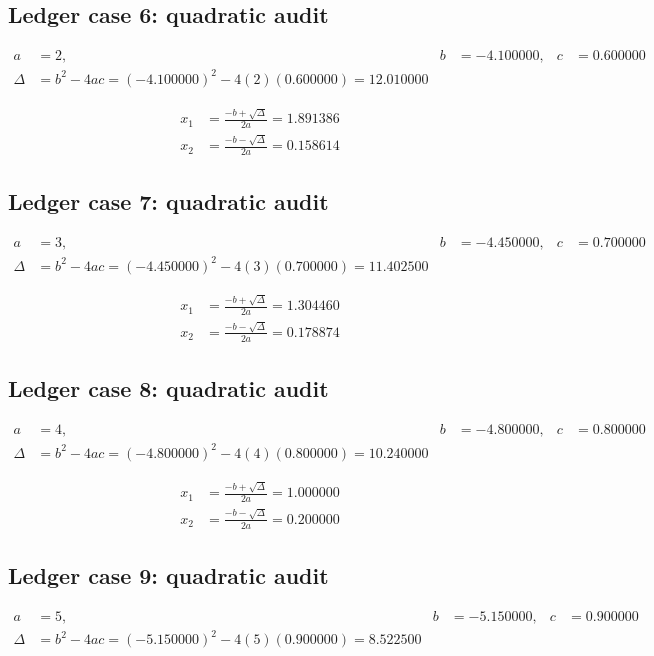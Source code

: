\documentclass[11pt,a4paper]{article}
\begin{document}
\subsection{Ledger case 6: quadratic audit}
\begin{align}
a &= 2, & b &= -4.100000, & c &= 0.600000 \\
\Delta &= b^2-4ac = (-4.100000)^2 - 4(2)(0.600000) = 12.010000
\end{align}

\begin{align}
x_1 &= \frac{-b+\sqrt{\Delta}}{2a} = 1.891386 \\
x_2 &= \frac{-b-\sqrt{\Delta}}{2a} = 0.158614
\end{align}

\newpage

\subsection{Ledger case 7: quadratic audit}
\begin{align}
a &= 3, & b &= -4.450000, & c &= 0.700000 \\
\Delta &= b^2-4ac = (-4.450000)^2 - 4(3)(0.700000) = 11.402500
\end{align}

\begin{align}
x_1 &= \frac{-b+\sqrt{\Delta}}{2a} = 1.304460 \\
x_2 &= \frac{-b-\sqrt{\Delta}}{2a} = 0.178874
\end{align}

\subsection{Ledger case 8: quadratic audit}
\begin{align}
a &= 4, & b &= -4.800000, & c &= 0.800000 \\
\Delta &= b^2-4ac = (-4.800000)^2 - 4(4)(0.800000) = 10.240000
\end{align}

\begin{align}
x_1 &= \frac{-b+\sqrt{\Delta}}{2a} = 1.000000 \\
x_2 &= \frac{-b-\sqrt{\Delta}}{2a} = 0.200000
\end{align}

\subsection{Ledger case 9: quadratic audit}
\begin{align}
a &= 5, & b &= -5.150000, & c &= 0.900000 \\
\Delta &= b^2-4ac = (-5.150000)^2 - 4(5)(0.900000) = 8.522500
\end{align}
\end{document}
